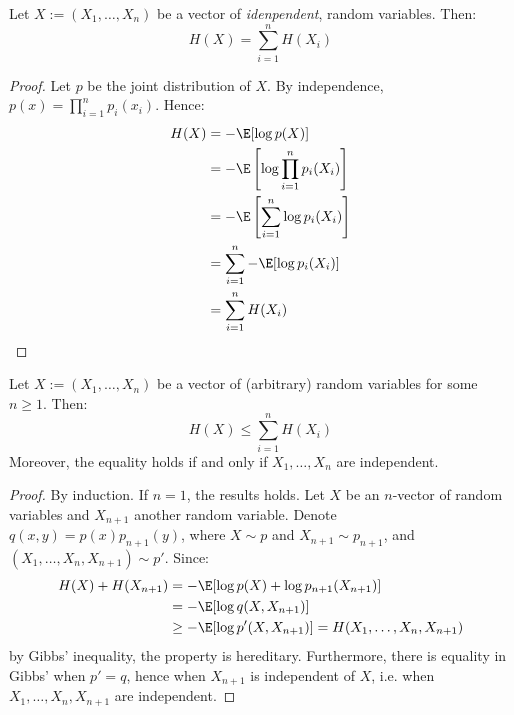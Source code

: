 \documentclass[toc, titlepaged]{../cs-classes/cs-classes}
\begin{document}
\begin{property}
    Let $X:=(X_1, \dots, X_n)$ be a vector of \emph{idenpendent}, random variables. Then:
    \begin{equation}
        H(X)=\sum_{i=1}^n H(X_i)
    \end{equation}
\end{property}

\begin{proof}
    Let $p$ be the joint distribution of $X$. By independence, $p(x)=\prod_{i=1}^n p_i(x_i)$. Hence:
    \begin{equation*}
        \begin{aligned}
            H(X)&=-\E[\log p(X)]\\
            &=-\E\left[\log\prod_{i=1}^n p_i(X_i)\right]\\
            &=-\E\left[\sum_{i=1}^n\log p_i(X_i)\right]\\
            &=\sum_{i=1}^n-\E[\log p_i(X_i)]\\
            &=\sum_{i=1}^n H(X_i)
        \end{aligned}
    \end{equation*}
\end{proof}

\begin{property}
    Let $X:=(X_1, \dots, X_n)$ be a vector of (arbitrary) random variables for some $n\geq 1$. Then:
    \begin{equation}
        H(X)\leq \sum_{i=1}^n H(X_i)
    \end{equation}
    Moreover, the equality holds if and only if $X_1, \dots, X_n$ are independent.
\end{property}

\begin{proof}
    By induction. If $n=1$, the results holds. Let $X$ be an $n$-vector of random variables and $X_{n+1}$ another random variable. Denote $q(x, y)=p(x)p_{n+1}(y)$, where $X\sim p$ and $X_{n+1}\sim p_{n+1}$, and $(X_1, \dots, X_n, X_{n+1})\sim p'$. Since:
    \begin{equation*}
        \begin{aligned}
            H(X) + H(X_{n+1}) &= -\E[\log p(X)+\log p_{n+1}(X_{n+1})]\\
            &=-\E[\log q(X, X_{n+1})]\\
            &\geq -\E[\log p'(X, X_{n+1})] = H(X_1, \dots, X_n, X_{n+1})
        \end{aligned}
    \end{equation*}
    by Gibbs' inequality, the property is hereditary. Furthermore, there is equality in Gibbs' when $p'=q$, hence when $X_{n+1}$ is independent of $X$, i.e. when $X_1, \dots, X_n, X_{n+1}$ are independent.
\end{proof}
\end{document}
